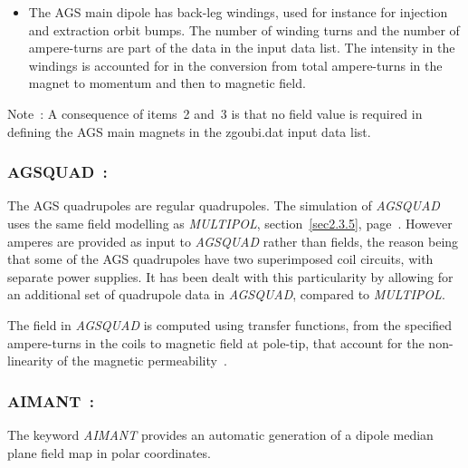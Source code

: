 {\begin{itemize}
  \item The AGS main dipole has back-leg windings, used for instance for injection and extraction orbit bumps. 
The number of winding turns and the  number of ampere-turns 
are part of the data in the input data list. The intensity in the windings is  accounted for in the conversion 
 from total ampere-turns in the magnet  to momentum and then to magnetic field. 
\end{itemize}

\bigskip

  \noindent Note~: A consequence of  items~2 and~3 is that  no field value is required in defining the AGS main magnets in 
the  zgoubi.dat input data list. 




\newpage

\subsubsection*{AGSQUAD~:  \AGSQUADTitl} \label{AGSQUAD}
\medskip 

The AGS quadrupoles are regular quadrupoles. 
The simulation of  \textsl{AGSQUAD}  uses the same field modelling as \textsl{MULTIPOL}, 
section~\ref{sec2.3.5}, page~\pageref{sec2.3.5}.  However amperes are provided as input to 
 \textsl{AGSQUAD} rather than fields, the reason being that 
 some of the AGS quadrupoles  have two superimposed coil circuits, with separate power supplies. 
It has been dealt with this 
particularity by allowing  for an additional set of quadrupole data in \textsl{AGSQUAD}, compared to \textsl{MULTIPOL}. 

\bigskip

\noindent The field in \textsl{AGSQUAD} is computed using transfer functions, from the specified ampere-turns in the coils to 
magnetic field at pole-tip, that  account for the non-linearity of the magnetic permeability~\cite{MADXAGSModel}. 



\newpage



\subsubsection*{AIMANT~:  \AIMANTTitl}\label{AIMANT}
\medskip

The keyword \textsl{AIMANT} provides an automatic
generation of a dipole median plane field map in polar coordinates. 

}
